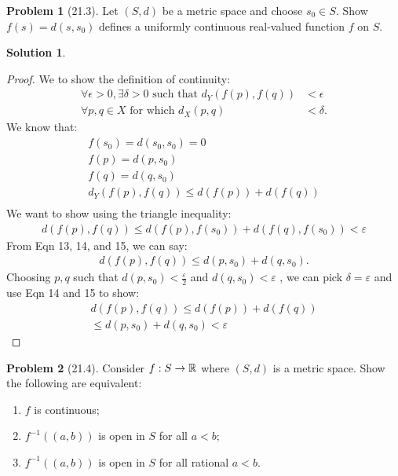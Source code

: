 \documentclass[12pt]{article}
\theoremstyle{definition} %
\newtheorem{solution}{Solution}
\newtheorem{problem}{Problem}
\theoremstyle{plain} %
\begin{document}
\begin{problem}[21.3]
    Let $(S,d)$ be a metric space and choose $s_{0} \in S$. Show $f(s)=d(s,s_{0})$ defines a uniformly continuous real-valued function $f$ on $S$.
\end{problem}
\begin{solution}
\begin{proof}
  We to show the definition of continuity:
  \begin{align}
    \forall \epsilon > 0, \exists \delta > 0 \text{ such that } d_Y(f(p), f(q)) &< \epsilon \\
    \forall p, q \in X \text{ for which } d_X(p, q) &< \delta. 
    \end{align}
    We know that:
    \begin{align}
      f(s_0) = d(s_0, s_0) = 0 \\[10pt] 
      f(p)= d(p, s_0) \\[10pt] 
      f(q)= d(q, s_0) \\[10pt] 
      d_Y(f(p),f(q))\leq d(f(p)) + d(f(q))\\[10pt] 
    \end{align}
We want to show using the triangle inequality:
\begin{align} 
      d(f(p),f(q))\leq d(f(p),f(s_0))+d(f(q),f(s_0))< \varepsilon
\end{align}
From Eqn 13, 14, and 15, we can say: 
\begin{align}
  d(f(p),f(q))\leq d(p,s_0)+d(q,s_0).
\end{align}
Choosing $p,q$ such that $d(p,s_0)<\frac{\varepsilon}{2}$ and $d(q,s_0)<\varepsilon$ , we can pick $\delta =\varepsilon$ and use Eqn 14 and 15 to show:
\begin{align}
  d(f(p),f(q))\leq d(f(p))+d(f(q))\\[10pt] 
  \leq d(p,s_0)+d(q,s_0)<\varepsilon
\end{align} 
\end{proof}
\end{solution}
\begin{problem}[21.4]
    Consider $f:S\to \mathbb{\MakeUppercase{r}} $ where $(S,d)$ is a metric space. Show the following are equivalent:
    \begin{enumerate}
        \item $f$ is continuous;
        \item $f^{-1}((a,b)) $ is open in $S$ for all $a<b$;
        \item $f^{-1}((a,b))$ is open in $S$ for all rational $a<b$.
    \end{enumerate}
\end{problem}
\end{document}
